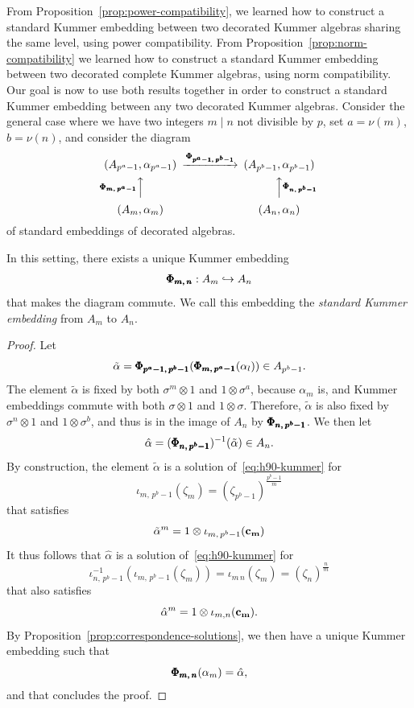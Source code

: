From Proposition~\ref{prop:power-compatibility}, we learned how to construct a
standard Kummer embedding between two decorated Kummer algebras sharing the same
level, using power compatibility. From Proposition~\ref{prop:norm-compatibility}
we learned how to construct a standard Kummer embedding between two decorated
complete Kummer algebras, using norm compatibility. Our goal is
now to use both results together in order to construct a standard Kummer
embedding between any two decorated Kummer algebras. Consider the general
case where we have two integers
$m\mid n$ not divisible by $p$, set $a=\nu(m)$, $b=\nu(n)$, and consider
the diagram
\begin{equation*}
\label{3cotes}
\begin{CD}
(A_{p^a-1},\alpha_{p^a-1}) @>{\stdemb{p^a-1}{p^b-1}}>> (A_{p^b-1},\alpha_{p^b-1}) \\
@A{\stdemb{m}{p^a-1}}AA @AA{\stdemb{n}{p^b-1}}A\\
(A_m,\alpha_m) @. (A_n,\alpha_n)
\end{CD}
\end{equation*}
of standard embeddings of decorated algebras.
\begin{lm}
  \label{lm:existence-embedding}
  In this setting, there exists a unique Kummer embedding
  \[
    \pmb{\Phi_{{m},\,{n}}}:A_m\hookrightarrow A_n
  \]
  that makes the diagram commute. We call this embedding the \emph{standard
  Kummer embedding} from $A_m$ to $A_n$.
\end{lm}
\begin{proof}
  Let
  \[
    \tilde\alpha = \pmb{\Phi_{{p^a-1},\,{p^b-1}}}(\pmb{\Phi_{{m},\,{p^a-1}}}(\alpha_l))\in
    A_{p^b-1}.
  \]
  The element $\tilde\alpha$ is fixed by both $\sigma^m\otimes1$ and
  $1\otimes\sigma^a$, because $\alpha_m$ is, and Kummer embeddings commute with both
  $\sigma\otimes1$ and $1\otimes\sigma$. Therefore, $\tilde\alpha$ is also fixed
  by $\sigma^n\otimes1$ and $1\otimes\sigma^b$, and thus is in the image of
  $A_n$ by $\pmb{\Phi_{{n},\,{p^b-1}}}$. We then let
  \[
    \hat\alpha = (\pmb{\Phi_{{n},\,{p^b-1}}})^{-1}(\tilde\alpha)\in A_n.
  \]
  By construction, the element $\tilde\alpha$ is a solution
  of~\eqref{eq:h90-kummer} for
  \[
    \iota_{m,\,p^b-1}(\zeta_m) = (\zeta_{p^b-1})^{\frac{p^b-1}{m}}
  \]
  that satisfies
  \[
    \tilde\alpha^m = 1\otimes\iota_{m,\,p^b-1}(\mathbf{c_{m}})
  \]
  It thus follows that $\hat\alpha$ is a solution
  of~\eqref{eq:h90-kummer} for 
  \[
    \iota_{n,\,p^b-1}^{-1}(\iota_{m,\,p^b-1}(\zeta_m)) =
    \iota_{m\,n}(\zeta_m)=(\zeta_n)^{\frac{n}{m}}
  \]
  that also satisfies 
  \[
    \hat\alpha^m = 1\otimes\iota_{m,n}(\mathbf{c_{m}}).
  \]
  By Proposition~\ref{prop:correspondence-solutions}, we then have a unique
  Kummer embedding such that
  \[
    \pmb{\Phi_{{m},\,{n}}}(\alpha_m) = \hat\alpha,
  \]
  and that concludes the proof.
\end{proof}
